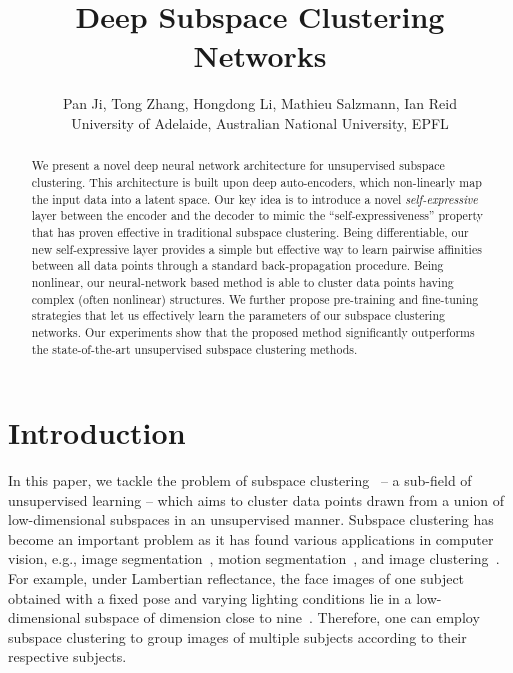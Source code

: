 \documentclass{article}
\title{Deep Subspace Clustering Networks}
\author{
  Pan Ji, Tong Zhang, Hongdong Li, Mathieu Salzmann, Ian Reid\\
  University of Adelaide, Australian National University, EPFL 
}
\begin{document}
\setlength{\abovedisplayskip}{4pt}
\setlength{\belowdisplayskip}{4pt}

\maketitle
\begin{abstract}
We present a novel deep neural network architecture for unsupervised subspace clustering. This architecture is built upon deep auto-encoders, which non-linearly map the input data into a latent space. Our key idea is to introduce a novel \emph{self-expressive} layer between the encoder and the decoder to mimic the ``self-expressiveness'' property that has proven effective in traditional subspace clustering. Being differentiable, our new self-expressive layer provides a simple but effective way to learn pairwise affinities between all data points through a standard back-propagation procedure. Being nonlinear, our neural-network based method is able to cluster data points having complex (often nonlinear) structures. We further propose pre-training and fine-tuning strategies that let us effectively learn the parameters of our subspace clustering networks. Our experiments show that the proposed method significantly outperforms the state-of-the-art unsupervised subspace clustering methods.
\end{abstract}

\section{Introduction}

In this paper, we tackle the problem of subspace clustering~\cite{vidal2011subspace} -- a sub-field of unsupervised learning --  which aims to cluster data points drawn from a union of low-dimensional subspaces in an unsupervised manner. Subspace clustering has become an important problem as it has found various applications in computer vision, e.g., image segmentation~\cite{yang2008unsupervised,ma2007segmentation}, motion segmentation~\cite{kanatani2001motion,elhamifar2009sparse}, and image clustering~\cite{ho2003clustering,elhamifar2013sparse}. For example, under Lambertian reflectance, the face images of one subject obtained with a fixed pose and varying lighting conditions lie in a low-dimensional subspace of dimension close to nine~\cite{basri2003lambertian}. Therefore, one can employ subspace clustering to group images of multiple subjects according to their respective subjects.
\end{document}
